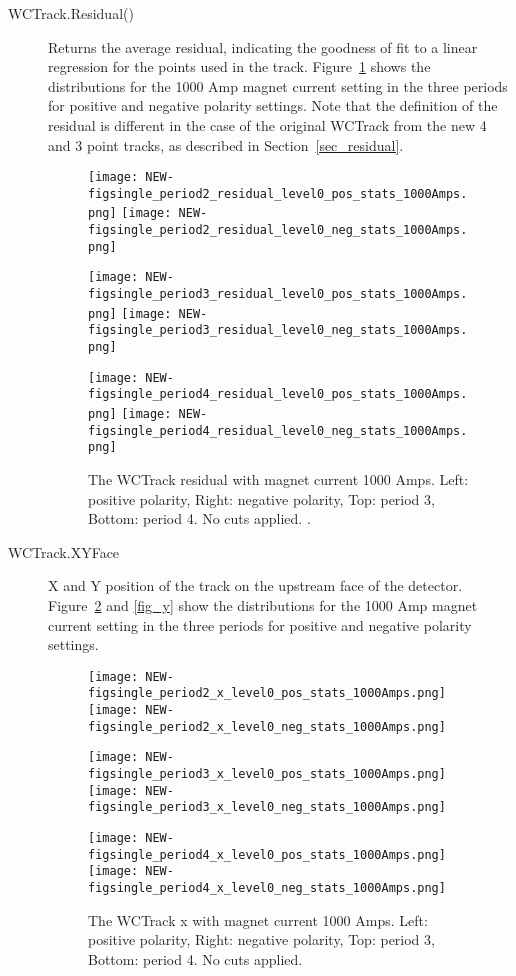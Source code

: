 \begin{description}
 \item[WCTrack.Residual()] {   
   Returns the average residual, indicating the goodness of fit to a linear regression for the points used in the track. Figure~\ref{fig_residual} shows the  distributions for the 1000 Amp magnet current setting in the three periods for positive and negative polarity settings. Note that the definition of the residual is different in the case of the original WCTrack from the new 4 and 3 point tracks, as described in Section~\ref{sec_residual}.
         \begin{figure}[h]
           \centering   
            	\texttt{[image: NEW-figsingle\_period2\_residual\_level0\_pos\_stats\_1000Amps.png]}
	 \texttt{[image: NEW-figsingle\_period2\_residual\_level0\_neg\_stats\_1000Amps.png]}
	 
   	\texttt{[image: NEW-figsingle\_period3\_residual\_level0\_pos\_stats\_1000Amps.png]}
	 \texttt{[image: NEW-figsingle\_period3\_residual\_level0\_neg\_stats\_1000Amps.png]}
	 
 	\texttt{[image: NEW-figsingle\_period4\_residual\_level0\_pos\_stats\_1000Amps.png]}
	 \texttt{[image: NEW-figsingle\_period4\_residual\_level0\_neg\_stats\_1000Amps.png]}
   \caption[short]{The WCTrack residual with magnet current 1000 Amps. Left: positive polarity, Right: negative polarity, Top: period 3, Bottom: period 4. No cuts applied. .}
   \label{fig_residual}
  \end{figure}
 }
   
\item[WCTrack.XYFace]{
  X and Y position of the track on the upstream face of the detector. Figure~\ref{fig_x} and  \ref{fig_y} show the distributions for the 1000 Amp magnet current setting in the three periods for positive and negative polarity settings.
      \begin{figure}[h]
        \centering   
         	\texttt{[image: NEW-figsingle\_period2\_x\_level0\_pos\_stats\_1000Amps.png]}
	 \texttt{[image: NEW-figsingle\_period2\_x\_level0\_neg\_stats\_1000Amps.png]}
	 
   	\texttt{[image: NEW-figsingle\_period3\_x\_level0\_pos\_stats\_1000Amps.png]}
	 \texttt{[image: NEW-figsingle\_period3\_x\_level0\_neg\_stats\_1000Amps.png]}
	 
 	\texttt{[image: NEW-figsingle\_period4\_x\_level0\_pos\_stats\_1000Amps.png]}
	 \texttt{[image: NEW-figsingle\_period4\_x\_level0\_neg\_stats\_1000Amps.png]}
   \caption[short]{The WCTrack x with magnet current 1000 Amps. Left: positive polarity, Right: negative polarity, Top: period 3, Bottom: period 4. No cuts applied.}
   \label{fig_x}
  \end{figure}
  
}
\end{description}
